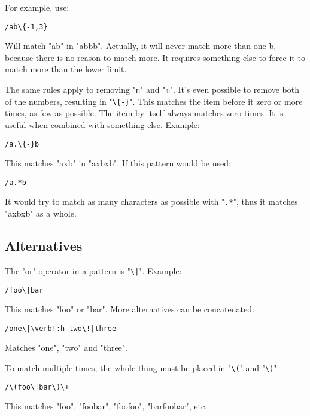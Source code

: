 For example, use:

\begin{Verbatim}[samepage=true]
 /ab\{-1,3}
\end{Verbatim}

Will match "ab" in "abbb".
Actually, it will never match more than one b, because there is no reason to match more.
It requires something else to force it to match more than the lower limit.

The same rules apply to removing "\verb!n!" and "\verb!m!".
It's even possible to remove both of the numbers, resulting in "\verb!\{-}!".
This matches the item before it zero or more times, as few as possible.
The item by itself always matches zero times.
It is useful when combined with something else.
Example:

\begin{Verbatim}[samepage=true]
 /a.\{-}b
\end{Verbatim}

This matches "axb" in "axbxb".
If this pattern would be used:

\begin{Verbatim}[samepage=true]
 /a.*b
\end{Verbatim}

It would try to match as many characters as possible with "\verb!.*!", thus it matches "axbxb" as a whole.
\subsection{Alternatives}
The "or" operator in a pattern is "\verb!\|!".
Example:

\begin{Verbatim}[samepage=true]
 /foo\|bar
\end{Verbatim}

This matches "foo" or "bar".
More alternatives can be concatenated:

\begin{Verbatim}[samepage=true]
 /one\|\verb!:h two\!|three
\end{Verbatim}

Matches "one", "two" and "three".

To match multiple times, the whole thing must be placed in "\verb!\(!" and "\verb!\)!":

\begin{Verbatim}[samepage=true]
 /\(foo\|bar\)\+
\end{Verbatim}

This matches "foo", "foobar", "foofoo", "barfoobar", etc.

